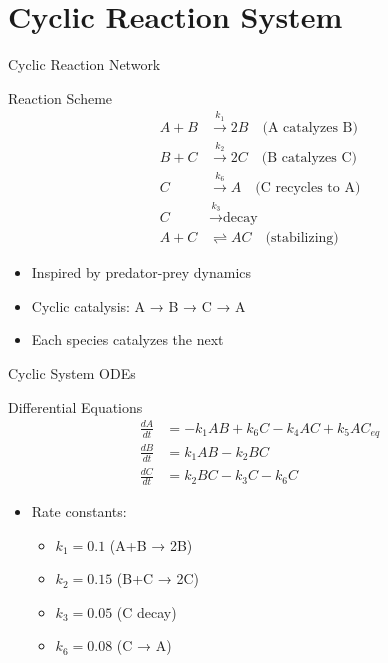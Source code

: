 \documentclass{beamer}
\begin{document}
\section{Cyclic Reaction System}

\begin{frame}{Cyclic Reaction Network}
\begin{block}{Reaction Scheme}
\begin{align}
A + B &\xrightarrow{k_1} 2B \quad \text{(A catalyzes B)} \\
B + C &\xrightarrow{k_2} 2C \quad \text{(B catalyzes C)} \\
C &\xrightarrow{k_6} A \quad \text{(C recycles to A)} \\
C &\xrightarrow{k_3} \text{decay} \\
A + C &\rightleftharpoons AC \quad \text{(stabilizing)}
\end{align}
\end{block}

\begin{itemize}
    \item Inspired by predator-prey dynamics
    \item Cyclic catalysis: A → B → C → A
    \item Each species catalyzes the next
\end{itemize}
\end{frame}

\begin{frame}{Cyclic System ODEs}
\begin{block}{Differential Equations}
\begin{align}
\frac{dA}{dt} &= -k_1 AB + k_6 C - k_4 AC + k_5 AC_{eq} \\
\frac{dB}{dt} &= k_1 AB - k_2 BC \\
\frac{dC}{dt} &= k_2 BC - k_3 C - k_6 C
\end{align}
\end{block}

\begin{itemize}
    \item Rate constants:
    \begin{itemize}
        \item $k_1 = 0.1$ (A+B → 2B)
        \item $k_2 = 0.15$ (B+C → 2C)
        \item $k_3 = 0.05$ (C decay)
        \item $k_6 = 0.08$ (C → A)
    \end{itemize}
\end{itemize}
\end{frame}
\end{document}
